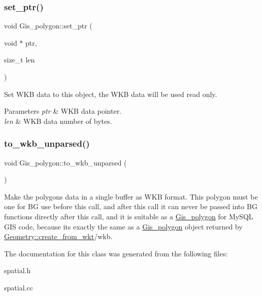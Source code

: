 \subsubsection{\texorpdfstring{set\+\_\+ptr()}{set\_ptr()}}
{\footnotesize\ttfamily void Gis\+\_\+polygon\+::set\+\_\+ptr (\begin{DoxyParamCaption}\item[{void $\ast$}]{ptr,  }\item[{size\+\_\+t}]{len }\end{DoxyParamCaption})}

Set W\+KB data to this object, the W\+KB data will be used read only. 
\begin{DoxyParams}{Parameters}
{\em ptr} & W\+KB data pointer. \\
\hline
{\em len} & W\+KB data number of bytes. \\
\hline
\end{DoxyParams}
\mbox{\label{classGis__polygon_a7bd6ed68da450be85891eb39142d3e60}} 
\subsubsection{\texorpdfstring{to\+\_\+wkb\+\_\+unparsed()}{to\_wkb\_unparsed()}}
{\footnotesize\ttfamily void Gis\+\_\+polygon\+::to\+\_\+wkb\+\_\+unparsed (\begin{DoxyParamCaption}{ }\end{DoxyParamCaption})}

Make the polygon\textquotesingle{}s data in a single buffer as W\+KB format. This polygon must be one for BG use before this call, and after this call it can never be passed into BG functions directly after this call, and it is suitable as a \mbox{\hyperlink{classGis__polygon}{Gis\+\_\+polygon}} for My\+S\+QL G\+IS code, because it\textquotesingle{}s exactly the same as a \mbox{\hyperlink{classGis__polygon}{Gis\+\_\+polygon}} object returned by \mbox{\hyperlink{classGeometry_a71d6852fd0285a9bffaca556592cae39}{Geometry\+::create\+\_\+from\+\_\+wkt}}/wkb. 

The documentation for this class was generated from the following files\+:\begin{DoxyCompactItemize}
\item 
spatial.\+h\item 
spatial.\+cc\end{DoxyCompactItemize}
